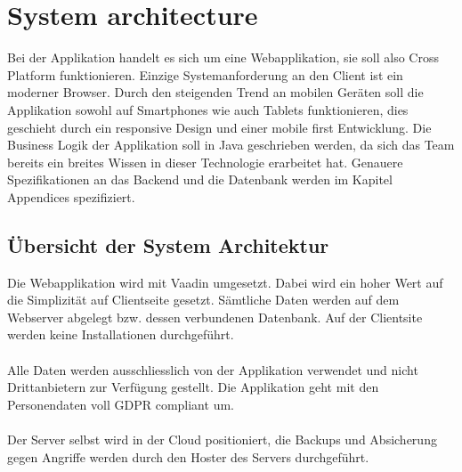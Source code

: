 \chapter{System architecture}
Bei der Applikation handelt es sich um eine Webapplikation, sie soll also \gls{Cross Platform} funktionieren. Einzige Systemanforderung an den Client ist ein moderner Browser. Durch den steigenden Trend an mobilen Geräten soll die Applikation sowohl auf Smartphones wie auch Tablets funktionieren, dies geschieht durch ein \gls{responsive Design} und einer \gls{mobile first} Entwicklung. Die Business Logik der Applikation soll in Java geschrieben werden, da sich das Team bereits ein breites Wissen in dieser Technologie erarbeitet hat. Genauere Spezifikationen an das Backend und die Datenbank werden im Kapitel Appendices spezifiziert.

\section{Übersicht der System Architektur}

Die Webapplikation wird mit \gls{Vaadin} umgesetzt. Dabei wird ein hoher Wert auf die Simplizität auf Clientseite gesetzt. Sämtliche Daten werden auf dem Webserver abgelegt bzw. dessen verbundenen Datenbank. Auf der Clientsite werden keine Installationen durchgeführt. \\ \\
Alle Daten werden ausschliesslich von der Applikation verwendet und nicht Drittanbietern zur Verfügung gestellt. Die Applikation geht mit den Personendaten voll \gls{GDPR compliant} um. \\ \\
Der Server selbst wird in der Cloud positioniert, die Backups und Absicherung gegen Angriffe werden durch den Hoster des Servers durchgeführt.
